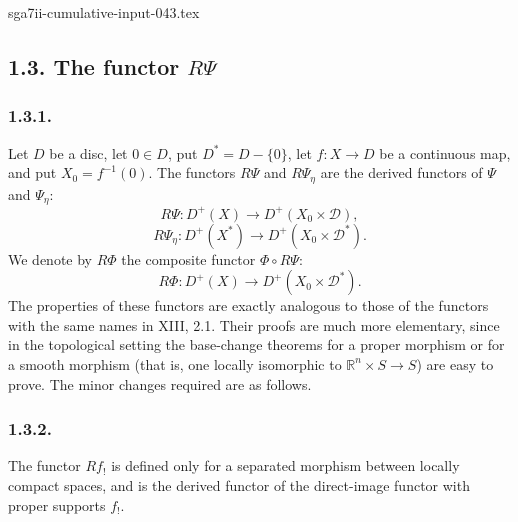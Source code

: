 \begin{filecontents*}{sga7ii-cumulative-input-043.tex}
\subsection*{1.3. The functor $R\Psi$}

\subsubsection*{1.3.1.}
Let $D$ be a disc, let $0\in D$, put $D^*=D-\{0\}$, let
$f:X\longrightarrow D$ be a continuous map, and put
$X_0=f^{-1}(0)$.  The functors $R\Psi$ and $R\Psi_\eta$ are the
derived functors of $\Psi$ and $\Psi_\eta$:
\[
R\Psi:D^+(X)\longrightarrow D^+(X_0\times\mathcal D),
\]
\[
R\Psi_\eta:D^+(X^*)\longrightarrow D^+(X_0\times\mathcal D^*).
\]
We denote by $R\Phi$ the composite functor $\Phi\circ R\Psi$:
\[
R\Phi:D^+(X)\longrightarrow D^+(X_0\times\mathcal D^*).
\]
The properties of these functors are exactly analogous to those of
the functors with the same names in XIII, 2.1.  Their proofs are much
more elementary, since in the topological setting the base-change
theorems for a proper morphism or for a smooth morphism (that is,
one locally isomorphic to $\mathbb R^n\times S\longrightarrow S$)
are easy to prove.  The minor changes required are as follows.

\subsubsection*{1.3.2.}
The functor $Rf_!$ is defined only for a separated morphism between
locally compact spaces, and is the derived functor of the direct-image
functor with proper supports $f_!$.


\end{filecontents*}
